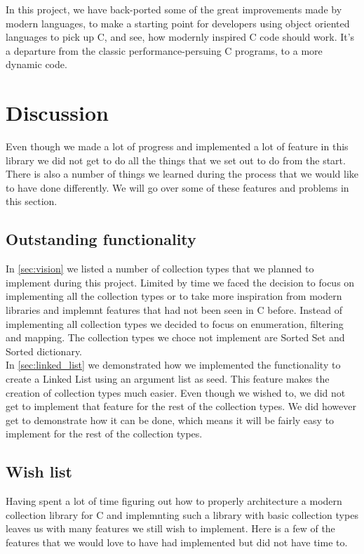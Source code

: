 \documentclass[table]{ituthesis}
\begin{document}
	In this project, we have back-ported some of the great improvements made by modern languages, to make a starting point for developers using object oriented languages to pick up C, and see, how modernly inspired C code should work. It's a departure from the classic performance-persuing C programs, to a more dynamic code.
	
	
	\section{Discussion}\label{sec:discussion}
	
		Even though we made a lot of progress and implemented a lot of feature in this library we did not get to do all the things that we set out to do from the start. There is also a number of things we learned during the process that we would like to have done differently. We will go over some of these features and problems in this section.
		
		\subsection{Outstanding functionality}
		
			In \autoref{sec:vision} we listed a number of collection types that we planned to implement during this project. Limited by time we faced the decision to focus on implementing all the collection types or to take more inspiration from modern libraries and implemnt features that had not been seen in C before. Instead of implementing all collection types we decided to focus on enumeration, filtering and mapping. The collection types we choce not implement are Sorted Set and Sorted dictionary.\\
			
			In \autoref{sec:linked_list} we demonstrated how we implemented the functionality to create a Linked List using an argument list as seed. This feature makes the creation of collection types much easier. Even though we wished to, we did not get to implement that feature for the rest of the collection types. We did however get to demonstrate how it can be done, which means it will be fairly easy to implement for the rest of the collection types.
			
		
		\subsection{Wish list}\label{sec:wishlist}
			
			Having spent a lot of time figuring out how to properly architecture a modern collection library for C and implemnting such a library with basic collection types leaves us with many features we still wish to implement. Here is a few of the features that we would love to have had implemented but did not have time to.
			
\end{document}
